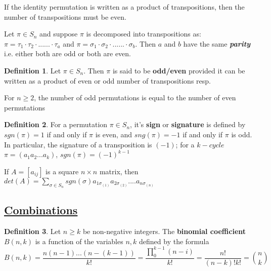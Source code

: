 \documentclass{article}
\theoremstyle{definition}
\newtheorem*{defi}{Definition}
\theoremstyle{definition}
\newenvironment{manualprop}[1]{%
  \renewcommand\themanualpropinner{#1}%
  \manualpropinner
}{\endmanualpropinner}
\newenvironment{manualtheorem}[1]{%
  \renewcommand\themanualtheoreminner{#1}%
  \manualtheoreminner
}{\endmanualtheoreminner}
\newenvironment{manuallemma}[1]{%
  \renewcommand\themanuallemmainner{#1}%
  \manuallemmainner
}{\endmanuallemmainner}
\theoremstyle{named}
\begin{document}
\begin{manuallemma}{20.2}[\textcolor{red}{important}]
If the identity permutation is written as a product of transpositions, then the number of transpositions must be even.
\end{manuallemma}

\begin{manualprop}{20}[\textcolor{red}{important}]
    Let $\pi \in S_n$ and suppose $\pi$ is decomposed into transpositions as: $\pi = \tau_1 \cdot \tau_2 \cdot ...... \cdot \tau_a$ and $\pi = \sigma_1 \cdot \sigma_2 \cdot ...... \cdot \sigma_b$. Then $a$ and $b$ have the same \textbf{\emph{parity}} i.e. either both are odd or both are even.
\end{manualprop}

\begin{defi}
Let $\pi \in S_n$. Then $\pi$ is said to be \textbf{odd/even} provided it can be written as a product of even or odd number of transpositions resp. 
\end{defi}

\begin{manualprop}{21}
    For $n\geq 2$, the number of odd permutations is equal to the number of even permutations
\end{manualprop}

\begin{defi}
For a permutation $\pi \in S_n$, it's \textbf{sign} or \textbf{signature} is defined by $sgn(\pi) = 1$ if and only if $\pi$ is even, and $sng(\pi) = -1$ if and only if $\pi$ is odd. In particular, the signature of a transposition is $(-1)$; for a $k-cycle$ $\pi = (a_1 a_2 ... a_k)$, $sgn(\pi) = (-1)^{k-1}$ 
\end{defi}

\begin{manualtheorem}{4 (Determinant Formula)}
    If $A = [a_{ij}]$ is a square $n \times n$ matrix, then $det(A) = \sum\limits_{\sigma \in S_{n} } sgn(\sigma) a_{1\sigma_{(1)}} a_{2\sigma_{(2)}} .... a_{n\sigma_{(n)}}$
\end{manualtheorem}




\subsection{\underline{Combinations}}
\begin{defi}
    Let $n \geq k$ be non-negative integers. The \textbf{binomial coefficient} $B(n, k)$ is a function of the variables $n, k$ defined by the formula \[
    B(n, k) = \frac{n(n-1)...(n-(k-1))}{k!} =\frac{\prod_{0}^{k-1} (n-i)}{k!} = \frac{n!}{(n-k)!k!} = \binom{n}{k}
    \]
\end{defi}
\end{document}
